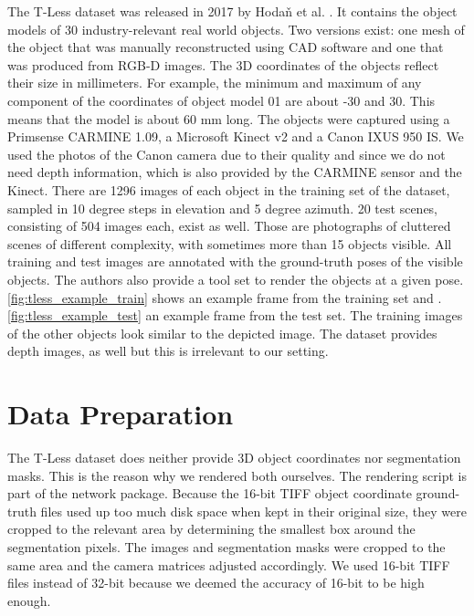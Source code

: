 The T-Less dataset was released in 2017 by Hoda\v{n} et al. \cite{tless}. It contains the object models of 30 industry-relevant real world objects. Two versions exist: one mesh of the object that was manually reconstructed using CAD software and one that was produced from RGB-D images. The 3D coordinates of the objects reflect their size in millimeters. For example, the minimum and maximum of any component of the coordinates of object model 01 are about -30 and 30. This means that the model is about 60 mm long. The objects were captured using a Primsense CARMINE 1.09, a Microsoft Kinect v2 and a Canon IXUS 950 IS. We used the photos of the Canon camera due to their quality and since we do not need depth information, which is also provided by the CARMINE sensor and the Kinect. There are 1296 images of each object in the training set of the dataset, sampled in 10 degree steps in elevation and 5 degree azimuth. 20 test scenes, consisting of 504 images each, exist as well. Those are photographs of cluttered scenes of different complexity, with sometimes more than 15 objects visible. All training and test images are annotated with the ground-truth poses of the visible objects. The authors also provide a tool set to render the objects at a given pose. \fig \ref{fig:tless_example_train} shows an example frame from the training set and \fig. \ref{fig:tless_example_test} an example frame from the test set. The training images of the other objects look similar to the depicted image. The dataset provides depth images, as well but this is irrelevant to our setting.



\section{Data Preparation}

The T-Less dataset does neither provide 3D object coordinates nor segmentation masks. This is the reason why we rendered both ourselves. The rendering script is part of the network package. Because the 16-bit TIFF object coordinate ground-truth files used up too much disk space when kept in their original size, they were cropped to the relevant area by determining the smallest box around the segmentation pixels. The images and segmentation masks were cropped to the same area and the camera matrices adjusted accordingly. We used 16-bit TIFF files instead of 32-bit because we deemed the accuracy of 16-bit to be high enough.

